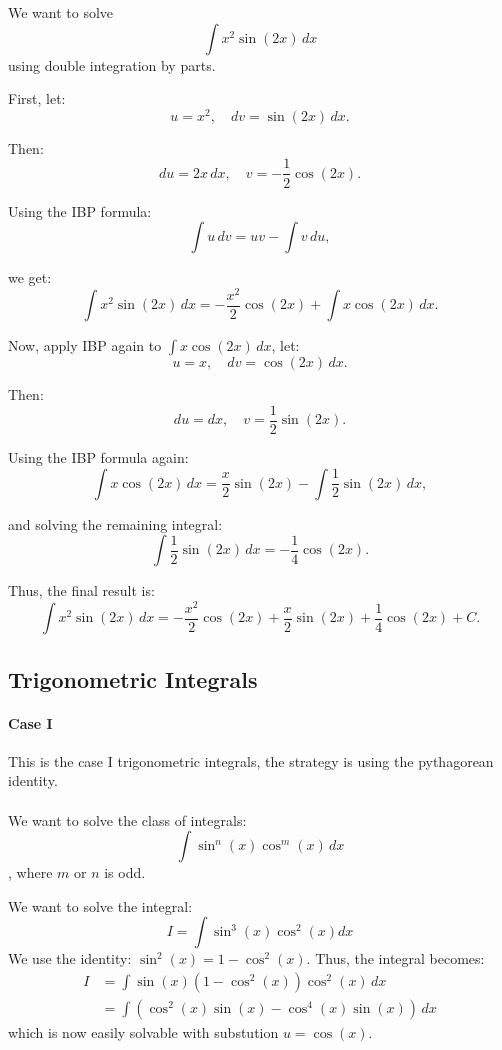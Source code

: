 \documentclass[11pt]{article}
\begin{document}
\begin{example}
We want to solve $$ \int x^2 \sin(2x) \, dx $$ using double integration by parts.

First, let:
$$ u = x^2, \quad dv = \sin(2x) \, dx. $$

Then:
$$ du = 2x \, dx, \quad v = -\frac{1}{2} \cos(2x). $$

Using the IBP formula:
$$ \int u \, dv = uv - \int v \, du, $$

we get:
$$ \int x^2 \sin(2x) \, dx = -\frac{x^2}{2} \cos(2x) + \int x \cos(2x) \, dx. $$

Now, apply IBP again to \( \int x \cos(2x) \, dx \), let:
$$ u = x, \quad dv = \cos(2x) \, dx. $$

Then:
$$ du = dx, \quad v = \frac{1}{2} \sin(2x). $$

Using the IBP formula again:
$$ \int x \cos(2x) \, dx = \frac{x}{2} \sin(2x) - \int \frac{1}{2} \sin(2x) \, dx, $$

and solving the remaining integral:
$$ \int \frac{1}{2} \sin(2x) \, dx = -\frac{1}{4} \cos(2x). $$

Thus, the final result is:
$$ \int x^2 \sin(2x) \, dx = -\frac{x^2}{2} \cos(2x) + \frac{x}{2} \sin(2x) + \frac{1}{4} \cos(2x) + C. $$

\end{example}
\subsection{Trigonometric Integrals}
\paragraph{Case I} This is the case I trigonometric integrals, the strategy is using the pythagorean identity.
\paragraph{} We want to solve the class of integrals:
\begin{equation}
 \int \sin^n(x) \cos^m(x) \, dx
\end{equation}
, where $m$ or $n$ is odd.
\begin{example}
We want to solve the integral:
$$ I = \int \sin^3(x) \cos^2(x) dx $$
We use the identity: $ \sin^2(x) = 1 - \cos^2(x)$. Thus, the integral becomes:
\begin{align*}
    I &= \int \sin(x)(1 - \cos^2(x)) \cos^2(x) \, dx \\
    &= \int (\cos^2(x) \sin(x) - \cos^4(x) \sin(x)) \, dx
\end{align*} 
which is now easily solvable with substution $u=\cos(x)$.
\end{example}
\end{document}

